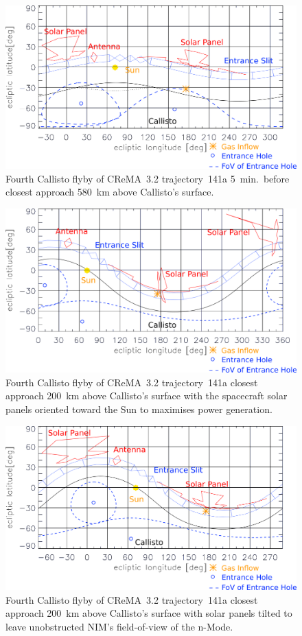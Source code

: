 	\begin{figure}[h!]
		\centering
		\includegraphics[width = .7\textwidth]{Bilder/NIM_pointing_2031JAN15194700.png}
		\caption{Fourth Callisto flyby of CReMA~3.2 trajectory~141a \cite{SOC_Crema3p2} 5~min.\ before closest approach 580~km above Callisto's surface.}
		\label{fig:FlybyCal1947}
	\end{figure}
	\begin{figure}[h!]
		\centering
		\includegraphics[width = .7\textwidth]{Bilder/NIM_pointing_2031JAN15195200_tilt.png}
		\caption{Fourth Callisto flyby of CReMA~3.2 trajectory~141a \cite{SOC_Crema3p2} closest approach 200~km above Callisto's surface with the spacecraft solar panels oriented toward the Sun to maximises power generation.}
		\label{fig:FlybyCal1952sol}
	\end{figure}
	\begin{figure}[h!]
		\centering
		\includegraphics[width = .7\textwidth]{Bilder/NIM_pointing_2031JAN15195200.png}
		\caption{Fourth Callisto flyby of CReMA~3.2 trajectory~141a \cite{SOC_Crema3p2} closest approach 200~km above Callisto's surface with solar panels tilted to leave unobstructed NIM's field-of-view of the n-Mode.}
		\label{fig:FlybyCal1952}
	\end{figure}
